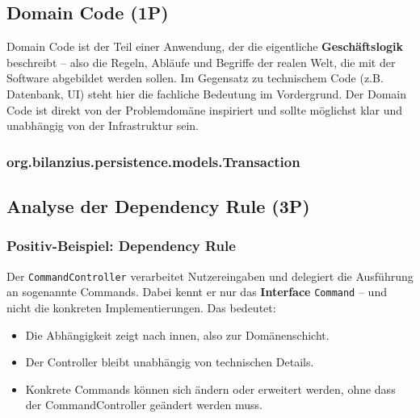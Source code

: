 \subsection{Domain Code (1P)}
Domain Code ist der Teil einer Anwendung, der die eigentliche \textbf{Geschäftslogik} beschreibt – also die Regeln, Abläufe und Begriffe der realen Welt, die mit der Software abgebildet werden sollen. Im Gegensatz zu technischem Code (z.B. Datenbank, UI) steht hier die fachliche Bedeutung im Vordergrund. Der Domain Code ist direkt von der Problemdomäne inspiriert und sollte möglichst klar und unabhängig von der Infrastruktur sein.

\subsubsection*{org.bilanzius.persistence.models.Transaction}




\subsection{Analyse der Dependency Rule (3P)}

\subsubsection*{Positiv-Beispiel: Dependency Rule}
Der \texttt{CommandController} verarbeitet Nutzereingaben und delegiert die Ausführung an sogenannte Commands. Dabei kennt er nur das \textbf{Interface} \texttt{Command} – und nicht die konkreten Implementierungen. Das bedeutet:
\begin{itemize}
    \item Die Abhängigkeit zeigt nach innen, also zur Domänenschicht.
    \item Der Controller bleibt unabhängig von technischen Details.
    \item Konkrete Commands können sich ändern oder erweitert werden, ohne dass der CommandController geändert werden muss.
\end{itemize}

